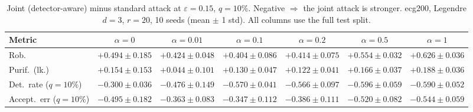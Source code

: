 \begin{table}[htbp]
  \centering
  \small
  \begin{tabular}{@{}lcccccc@{}}
    \toprule
    Metric & $\alpha{=}0$ & $\alpha{=}0.01$ & $\alpha{=}0.1$ & $\alpha{=}0.2$ & $\alpha{=}0.5$ & $\alpha{=}1$ \\
    \midrule
    Rob. & $+0.494 \pm 0.185$ & $+0.424 \pm 0.048$ & $+0.404 \pm 0.086$ & $+0.414 \pm 0.075$ & $+0.554 \pm 0.032$ & $+0.626 \pm 0.036$ \\
    Purif.\ (lk.) & $+0.154 \pm 0.153$ & $+0.044 \pm 0.101$ & $+0.130 \pm 0.047$ & $+0.122 \pm 0.041$ & $+0.166 \pm 0.037$ & $+0.188 \pm 0.036$ \\
    Det.\ rate ($q{=}10\%$) & $-0.300 \pm 0.036$ & $-0.476 \pm 0.149$ & $-0.570 \pm 0.041$ & $-0.566 \pm 0.097$ & $-0.596 \pm 0.059$ & $-0.590 \pm 0.052$ \\
    Accept.\ err ($q{=}10\%$) & $-0.495 \pm 0.182$ & $-0.363 \pm 0.083$ & $-0.347 \pm 0.112$ & $-0.386 \pm 0.111$ & $-0.520 \pm 0.082$ & $-0.544 \pm 0.059$ \\
    \bottomrule
  \end{tabular}
  \caption{Joint (detector-aware) minus standard attack at $\varepsilon=0.15$, $q{=}10\%$. Negative $\Rightarrow$ the joint attack is stronger. ecg200, Legendre $d{=}3$, $r{=}20$, 10 seeds (mean $\pm$ 1 std). All columns use the full test split.}
  \label{tab:ecg200_joint_r20_eps0.15}
\end{table}

